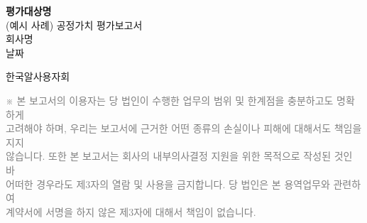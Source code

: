 \documentclass[12pt]{article}
\begin{document}
\vspace*{3cm}

\begin{center}
    {\Huge \bfseries {{ 평가대상명 }}}\\[2.5cm]
    {\Large (예시 사례) 공정가치 평가보고서}\\[3.5cm]
    {\large {{ 회사명 }}}\\[0.5cm]
    {\large {{ 날짜 }}}\\
\end{center}

\vfill

\begin{flushright}
  {\Large 한국알사용자회}
\end{flushright}

\vspace{1cm}

\begin{flushleft}
\small
\textcolor{gray}{
    ※ 본 보고서의 이용자는 당 법인이 수행한 업무의 범위 및 한계점을 충분하고도 명확하게 \\
    고려해야 하며, 우리는 보고서에 근거한 어떤 종류의 손실이나 피해에 대해서도 책임을 지지\\
    않습니다. 또한 본 보고서는 회사의 내부의사결정 지원을 위한 목적으로 작성된 것인 바\\
    어떠한 경우라도 제3자의 열람 및 사용을 금지합니다. 당 법인은 본 용역업무와 관련하여\\
    계약서에 서명을 하지 않은 제3자에 대해서 책임이 없습니다.
}
\end{flushleft}
\end{document}
